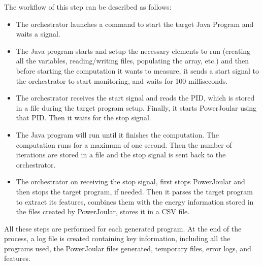 The workflow of this step can be described as follows:



\begin{itemize}
  \item The orchestrator launches a command to start the target Java Program and waits a signal.
  \item The Java program starts and setup the necessary elements to run (creating all the variables, reading/writing files, populating the array, etc.) and then before starting the computation it wants to measure, it sends a start signal to the orchestrator to start monitoring, and waits for 100 milliseconds.
  \item The orchestrator receives the start signal and reads the PID, which is stored in a file during the target program setup. Finally, it starts PowerJoular using that PID. Then it waits for the stop signal.
  \item The Java program will run until it finishes the computation. The computation runs for a maximum of one second. Then the number of iterations are stored in a file and the stop signal is sent back to the orchestrator.
  \item The orchestrator on receiving the stop signal, first stops PowerJoular and then stops the target program, if needed. Then it parses the target program to extract its features, combines them with the energy information stored in the files created by PowerJoular, stores it in a CSV file.
\end{itemize}

All these steps are performed for each generated program. At the end of the process, a log file is created containing key information, including all the programs used, the PowerJoular files generated, temporary files, error logs, and features.
